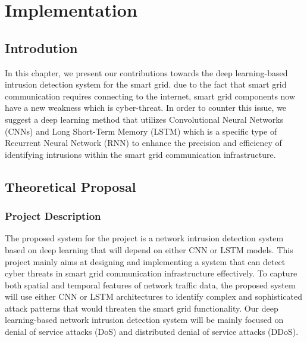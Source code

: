 




\chapter{Implementation} \label{chap:Implementation}
\section*{Introdution}


In this chapter, we present our contributions towards the deep learning-based intrusion detection system for the smart grid. due to the fact that smart grid communication requires connecting to the internet, smart grid components now have a new weakness which is cyber-threat. In order to counter this issue, we suggest a deep learning method that utilizes Convolutional Neural Networks (CNNs) and Long Short-Term Memory (LSTM) which is a specific type of Recurrent Neural Network (RNN) to enhance the precision and efficiency of identifying intrusions within the smart grid communication infrastructure.





\section{Theoretical Proposal}

\subsection{Project Description}
The proposed system for the project is a network intrusion detection system based on deep learning that will depend on either CNN or LSTM models. This project mainly aims at designing and implementing a system that can detect cyber threats in smart grid communication infrastructure effectively. To capture both spatial and temporal features of network traffic data, the proposed system will use either CNN or LSTM architectures to identify complex and sophisticated attack patterns that would threaten the smart grid functionality.
Our deep learning-based network intrusion detection system will be mainly focused on denial of service attacks (DoS) and distributed denial of service attacks (DDoS).

